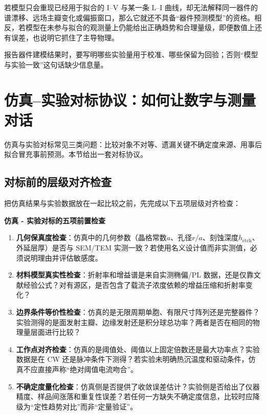 若模型只会重现已经用于拟合的 I--V 与某一条 L--I 曲线，却无法解释同一器件的谱漂移、远场主瓣变化或偏振窗口，那么它就还不具备“器件预测模型”的资格。相反，若模型在未参与拟合的观测量上仍能给出正确趋势和合理量级，即便数值上还有误差，也说明它抓住了主导物理。

报告器件建模结果时，要写明哪些实验量用于校准、哪些保留为回验；否则“模型与实验一致”这句话缺少信息量。

\section{仿真--实验对标协议：如何让数字与测量对话}
\label{sec:sim-exp-benchmark-protocol}
仿真与实验对标常见三类问题：比较对象不对等、遗漏关键不确定度来源、用事后拟合冒充事前预测。本节给出一套对标协议。

\subsection{对标前的层级对齐检查}
把仿真结果与实验数据放在一起比较之前，先完成以下五项层级对齐检查：

\begin{ExperimentalAlignmentBox}
\textbf{仿真 - 实验对标的五项前置检查}
\begin{enumerate}
  \item \textbf{几何保真度检查}：仿真中的几何参数（晶格常数$a$、孔径$r/a$、刻蚀深度$h_{\text{etch}}$、外延层厚）是否与 SEM/TEM 实测一致？若使用名义设计值而非实测值，必须说明理由并评估敏感度。
  
  \item \textbf{材料模型真实性检查}：折射率和增益谱是来自实测椭偏/PL 数据，还是仅靠文献经验公式？对有源区，是否包含了载流子浓度依赖的增益压缩和折射率变化？
  
  \item \textbf{边界条件等价性检查}：仿真的是无限周期单胞、有限尺寸阵列还是完整器件？实验测得的是面发射主瓣、边缘发射还是积分球总功率？两者是否在相同的物理量层面进行比较？
  
  \item \textbf{工作点对齐检查}：仿真的是阈值处、阈值以上固定倍数还是最大功率点？实验数据是在 CW 还是脉冲条件下测得？若实验未明确热沉温度和驱动条件，仿真不应直接声称“绝对阈值电流吻合”。
  
  \item \textbf{不确定度量化检查}：仿真侧是否提供了收敛误差估计？实验侧是否给出了仪器精度、样品间涨落和重复性误差？若任何一方缺失不确定度信息，比较时应降级为“定性趋势对比”而非“定量验证”。
\end{enumerate}
\end{ExperimentalAlignmentBox}

